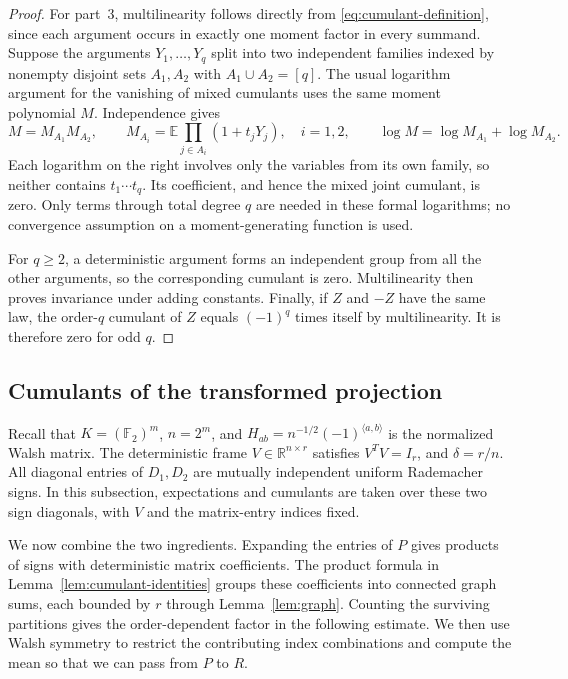 \documentclass[11pt]{article}
\theoremstyle{definition}
\theoremstyle{remark}
\theoremstyle{plain}
\newcommand{\E}{\mathbb E}
\newcommand{\F}{\mathbb F}
\newcommand{\R}{\mathbb R}
\begin{document}
\begin{proof}
For part~3, multilinearity follows directly from
\eqref{eq:cumulant-definition}, since each argument occurs in
exactly one moment factor in every summand.
Suppose the arguments $Y_1,\ldots,Y_q$ split into two
independent families indexed by nonempty disjoint sets $A_1,A_2$
with $A_1\cup A_2=[q]$. The usual logarithm argument for the
vanishing of mixed cumulants
\cite[\S3.B, lemma on p.~324]{leonov_shiryaev1959}
uses the same moment polynomial $M$. Independence gives
\[
 M=M_{A_1}M_{A_2},\qquad
 M_{A_i}=\E\prod_{j\in A_i}(1+t_jY_j),\quad i=1,2,
 \qquad \log M=\log M_{A_1}+\log M_{A_2}.
\]
Each logarithm on the right involves only the variables from its
own family, so neither contains $t_1\cdots t_q$. Its coefficient,
and hence the mixed joint cumulant, is zero. Only terms through
total degree $q$ are needed in these formal logarithms; no
convergence assumption on a moment-generating function is used.

For $q\ge2$, a deterministic argument forms an independent group
from all the other arguments, so the corresponding cumulant is
zero. Multilinearity then proves invariance under adding constants.
Finally, if $Z$ and $-Z$ have the same law, the order-$q$ cumulant
of $Z$ equals $(-1)^q$ times itself by multilinearity. It is
therefore zero for odd $q$.
\end{proof}

\subsection{Cumulants of the transformed projection}
\label{sec:projection-cumulants}

Recall that $K=(\F_2)^m$, $n=2^m$, and
$H_{ab}=n^{-1/2}(-1)^{\langle a,b\rangle}$ is the normalized Walsh
matrix. The deterministic frame $V\in\R^{n\times r}$ satisfies
$V^TV=I_r$, and $\delta=r/n$. All diagonal entries of $D_1,D_2$
are mutually independent uniform Rademacher signs. In this subsection,
expectations and cumulants are taken over these two sign diagonals,
with $V$ and the matrix-entry indices fixed.

We now combine the two ingredients. Expanding the entries of $P$
gives products of signs with deterministic matrix coefficients.
The product formula in Lemma~\ref{lem:cumulant-identities}
groups these coefficients into
connected graph sums, each bounded by $r$ through Lemma~\ref{lem:graph}.
Counting the surviving partitions gives the order-dependent factor
in the following estimate. We then use Walsh symmetry to restrict
the contributing index combinations and compute the mean so that
we can pass from $P$ to $R$.
\end{document}
